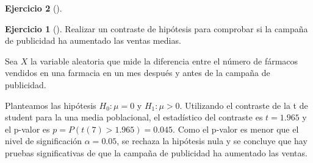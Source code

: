 \documentclass[
  a4paper,
]{scrreport}
\theoremstyle{definition}
\newtheorem{exercise}{Ejercicio}[chapter]
\theoremstyle{remark}
\begin{document}
\begin{exercise}[]
\begin{exercise}[]
Realizar un contraste de hipótesis para comprobar si la campaña de
publicidad ha aumentado las ventas medias.

\end{exercise}

\begin{tcolorbox}[enhanced jigsaw, leftrule=.75mm, colbacktitle=quarto-callout-tip-color!10!white, opacityback=0, colback=white, toprule=.15mm, colframe=quarto-callout-tip-color-frame, coltitle=black, left=2mm, title=\textcolor{quarto-callout-tip-color}{\faLightbulb}\hspace{0.5em}{Solución}, breakable, bottomtitle=1mm, bottomrule=.15mm, opacitybacktitle=0.6, toptitle=1mm, arc=.35mm, titlerule=0mm, rightrule=.15mm]

Sea \(X\) la variable aleatoria que mide la diferencia entre el número
de fármacos vendidos en una farmacia en un mes después y antes de la
campaña de publicidad.

Planteamos las hipótesis \(H_0: \mu = 0\) y \(H_1: \mu>0\). Utilizando
el contraste de la t de student para la una media poblacional, el
estadístico del contraste es \(t=1.965\) y el p-valor es
\(p = P(t(7)>1.965) = 0.045\). Como el p-valor es menor que el nivel de
significación \(\alpha = 0.05\), se rechaza la hipótesis nula y se
concluye que hay pruebas significativas de que la campaña de publicidad
ha aumentado las ventas.

\end{tcolorbox}

\end{exercise}
\end{document}

